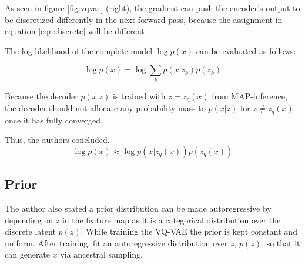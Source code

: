 As seen in figure \ref{fig:vqvae} (right), the gradient can push the encoder’s output to be discretized 
differently in the next forward pass, because the assignment in equation \ref{eqn:discrete} will be different

The log-likelihood of the complete model $\log p(x)$ can be evaluated as follows:

\begin{equation}
    \log p(x) = \log \sum _k p(x|z _k) p(z _k)
    \label{eqn:modellog}
\end{equation}

Because the decoder $p(x|z)$ is trained with $z = z _q(x)$ from MAP-inference, the decoder
should not allocate any probability mass to $p(x|z)$ for $z \neq z _q(x)$ once it has fully converged.

Thus, the authors concluded.~\cite{razavi2019generating, oord2018neural}
\begin{equation}
    \log p(x) \approx \log p(x|z _q(x))p(z _q(x))
\end{equation}

\subsection{Prior}

The author also stated a prior distribution can be made autoregressive by depending on $z$ 
in the feature map as it is a categorical distribution over the discrete latent $p(z)$. 
While training the VQ-VAE the prior is kept constant and uniform. After training, fit an autoregressive distribution over $z$, $p(z)$, so that it can generate $x$ via ancestral sampling.
